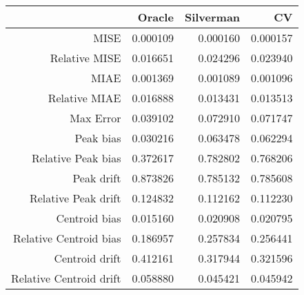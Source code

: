 \begin{tabular}{rrrr}
  \hline
 & Oracle & Silverman & CV \\ 
  \hline
MISE & 0.000109 & 0.000160 & 0.000157 \\ 
  Relative MISE & 0.016651 & 0.024296 & 0.023940 \\ 
  MIAE & 0.001369 & 0.001089 & 0.001096 \\ 
  Relative MIAE & 0.016888 & 0.013431 & 0.013513 \\ 
  Max Error & 0.039102 & 0.072910 & 0.071747 \\ 
  Peak bias & 0.030216 & 0.063478 & 0.062294 \\ 
  Relative Peak bias & 0.372617 & 0.782802 & 0.768206 \\ 
  Peak drift & 0.873826 & 0.785132 & 0.785608 \\ 
  Relative Peak drift & 0.124832 & 0.112162 & 0.112230 \\ 
  Centroid bias & 0.015160 & 0.020908 & 0.020795 \\ 
  Relative Centroid bias & 0.186957 & 0.257834 & 0.256441 \\ 
  Centroid drift & 0.412161 & 0.317944 & 0.321596 \\ 
  Relative Centroid drift & 0.058880 & 0.045421 & 0.045942 \\ 
   \hline
\end{tabular}
